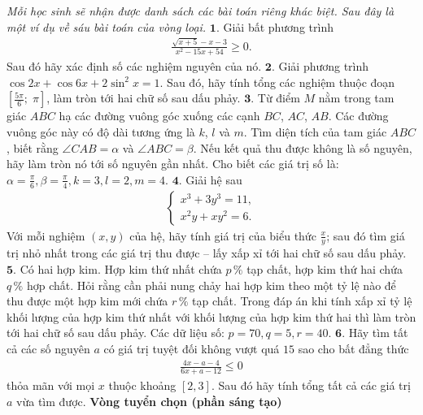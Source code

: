 \begin{multicols}{2}
	\vskip 0.1cm
	\textit{Mỗi học sinh sẽ nhận được danh sách các bài toán riêng khác biệt. Sau đây là một ví dụ về sáu bài toán của vòng loại.}
	\vskip 0.1cm
	$\pmb{1.}$ Giải bất phương trình
	\setlength{\abovedisplayskip}{5pt}
	\setlength{\belowdisplayskip}{5pt}
	\begin{align*}
		\frac{{\sqrt {x + 5}  - x - 3}}{{{x^2} - 15x + 54}} \ge 0.
	\end{align*}
	Sau đó hãy xác định số các nghiệm nguyên của nó.
	\vskip 0.1cm
	$\pmb{2.}$ Giải phương trình $\cos 2x + \cos 6x + 2\sin^2 x = 1$.
	\vskip 0.1cm
	Sau đó, hãy tính tổng các nghiệm thuộc đoạn $\left[ {\frac{{5\pi }}{6};\;\pi } \right]$, làm tròn tới hai chữ số sau dấu phảy.
	\vskip 0.1cm
	$\pmb{3.}$ Từ điểm $M$ nằm trong tam giác $ABC$ hạ các đường vuông góc xuống các cạnh $BC$, $AC$, $AB$. Các đường vuông góc này có độ dài tương ứng là $k$, $l$ và $m$. Tìm diện tích của tam giác $ABC$, biết rằng $\angle CAB = \alpha$ và  $\angle ABC = \beta$. Nếu kết quả thu được không là số nguyên, hãy làm tròn nó tới số nguyên gần nhất.
	\vskip 0.1cm
	Cho biết các giá trị số là:  $\alpha = \frac{\pi}{6}, \beta = \frac{\pi}{4},k=3  ,l=2  ,m=4$.
	\vskip 0.1cm 
	$\pmb{4.}$ Giải hệ sau
	\begin{align*}
		\begin{cases}
			x^3 + 3y^3 = 11,\\
			x^2y + xy^2 = 6.
		\end{cases}
	\end{align*}
	Với mỗi nghiệm $(x,y)$ của hệ, hãy tính giá trị của biểu thức $\frac{x}{y}$; sau đó tìm giá trị nhỏ nhất trong các giá trị thu được -- lấy xấp xỉ tới hai chữ số sau dấu phảy.
	\vskip 0.1cm
	$\pmb{5.}$ Có hai hợp kim. Hợp kim thứ nhất chứa $p\,\%$ tạp chất, hợp kim thứ hai chứa $q\,\%$ hợp chất. Hỏi rằng cần phải nung chảy hai hợp kim theo một tỷ lệ nào để thu được một hợp kim mới chứa $r\,\%$ tạp chất. Trong đáp án khi tính xấp xỉ tỷ lệ khối lượng của hợp kim thứ nhất với khối lượng của hợp kim thứ hai thì làm tròn tới hai chữ số sau \linebreak dấu phảy.
	\vskip 0.1cm
	Các dữ liệu số: $p = 70, q = 5, r = 40$.
	\vskip 0.1cm
	$\pmb{6.}$ Hãy tìm tất cả các số nguyên $a$ có giá trị tuyệt đối không vượt quá $15$ sao cho bất đẳng thức 
	\begin{align*}
		\frac{{4x - a - 4}}{{6x + a - 12}} \le 0
	\end{align*}
	thỏa mãn với mọi $x$ thuộc khoảng  $[2,3]$. Sau đó hãy tính tổng tất cả các giá trị $a$ vừa tìm được.
	\vskip 0.1cm
	\textbf{\color{cackithi}Vòng tuyển chọn (phần sáng tạo)}

\end{multicols}
